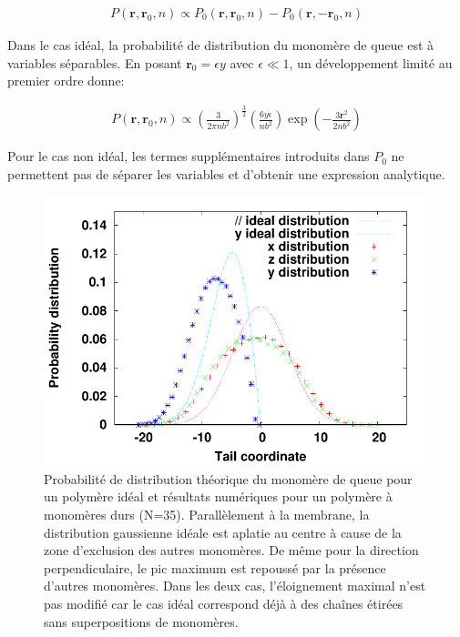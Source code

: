 \documentclass[a4paper,11pt]{article}
\begin{document}
\begin{eqnarray}
P(\textbf{r},\textbf{r}_0,n) \propto P_0(\textbf{r},\textbf{r}_0,n)-P_0(\textbf{r},-\textbf{r}_0,n)
\end{eqnarray}

Dans le cas idéal, la probabilité de distribution du monomère de queue est à variables séparables. En posant $\textbf{r}_0= \epsilon y$ avec $\epsilon \ll 1$, un développement limité au premier ordre donne:

\begin{eqnarray}
P(\textbf{r},\textbf{r}_0,n) \propto \left(\frac{3}{2\pi n b^2}\right)^\frac{3}{2} \left(\frac{6 y \epsilon}{n b^2}\right)\exp\left(-\frac{3\textbf{r}^2}{2 n b^2}\right)
\end{eqnarray}

Pour le cas non idéal, les termes supplémentaires introduits dans $P_0$ ne permettent pas de séparer les variables et d'obtenir une expression analytique.


\begin{figure}[H]
\begin{minipage}{0.45\linewidth}
\includegraphics[width=1.2\textwidth]{probdistribution.pdf}

\end{minipage}\hfill
\begin{minipage}{0.45\linewidth}
\caption{Probabilité de distribution théorique du monomère de queue pour un polymère idéal et résultats numériques pour un polymère à monomères durs (N=35). Parallèlement à la membrane, la distribution gaussienne idéale est aplatie au centre à cause de la zone d'exclusion des autres monomères. De même pour la direction perpendiculaire, le pic maximum est repoussé par la présence d'autres monomères. Dans les deux cas, l'éloignement maximal n'est pas modifié car le cas idéal correspond déjà à des chaînes étirées sans superpositions de monomères. }
\label{polagainstwall}
\end{minipage}
\end{figure}
\end{document}
